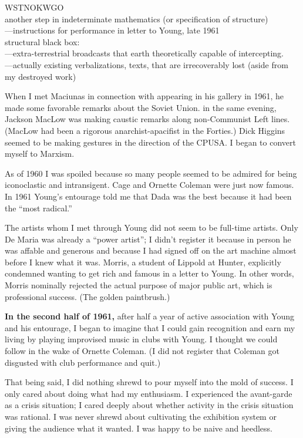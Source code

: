 \Pb
\textbullet WSTNOKWGO\\
another step in indeterminate mathematics (or specification of structure) \\
---instructions for performance in letter to Young, late 1961 \\
structural black box: \\
---extra-terrestrial broadcasts that earth theoretically capable of intercepting. \\
---actually existing verbalizations, texts, that are irrecoverably lost (aside from my destroyed work) \\

\Pb

When I met Maciunas in connection with appearing in his gallery in 1961, he made some favorable remarks about the Soviet Union.  in the same evening, Jackson MacLow was making caustic remarks along non-Communist Left lines.  (MacLow had been a rigorous anarchist-apacifist in the Forties.)  Dick Higgins seemed to be making gestures in the direction of the CPUSA.  I began to convert myself to Marxism.

\Pb

As of 1960 I was spoiled because so many people seemed to be admired for being iconoclastic and intransigent.  Cage and Ornette Coleman were just now famous.  In 1961 Young's entourage told me that Dada was the best because it had been the \enquote{most radical.}

The artists whom I met through Young did not seem to be full-time artists.  Only De Maria was already a \enquote{power artist}; I didn't register it because in person he was affable and generous and because I had signed off on the art machine almost before I knew what it was. Morris, a student of Lippold at Hunter, explicitly condemned wanting to get rich and famous in a letter to Young. In other words, Morris nominally rejected the actual purpose of major public art, which is professional success. (The golden paintbrush.)

\textbf{In the second half of 1961,} after half a year of active association with Young and his entourage, I began to imagine that I could gain recognition and earn my living by playing improvised music in clubs with Young.  I thought we could follow in the wake of Ornette Coleman.  (I did not register that Coleman got disgusted with club performance and quit.)

\Pb

That being said, I did nothing shrewd to pour myself into the mold of success.  I only cared about doing what had my enthusiasm.  I experienced the avant-garde as a crisis situation; I cared deeply about whether activity in the crisis situation was rational.  I was never shrewd about cultivating the exhibition system or giving the audience what it wanted.  I was happy to be naive and heedless.

